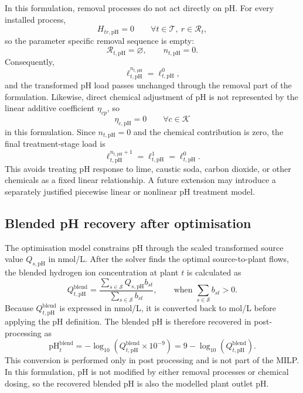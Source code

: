 \documentclass[10pt]{article}
\begin{document}
In this formulation, removal processes do not act directly on pH.
For every installed process,
\[
H_{tr,\mathrm{pH}}=0
\qquad
\forall t\in\mathcal{T},\ r\in\mathcal{R}_t,
\]
so the parameter specific removal sequence is empty:
\[
\mathcal{R}_{t,\mathrm{pH}}=\varnothing,
\qquad
n_{t,\mathrm{pH}}=0.
\]
Consequently,
\[
\ell^{n_{t,\mathrm{pH}}}_{t,\mathrm{pH}}
=
\ell^0_{t,\mathrm{pH}},
\]
and the transformed pH load passes unchanged through the removal part of the formulation.
Likewise, direct chemical adjustment of pH is not represented by the linear additive coefficient $\eta_{cp}$, so
\[
\eta_{c,\mathrm{pH}}=0
\qquad
\forall c\in\mathcal{K}
\]
in this formulation.
Since $n_{t,\mathrm{pH}}=0$ and the chemical contribution is zero, the final treatment-stage load is
\[
\ell^{n_{t,\mathrm{pH}}+1}_{t,\mathrm{pH}}
=
\ell^1_{t,\mathrm{pH}}
=
\ell^0_{t,\mathrm{pH}}.
\]
This avoids treating pH response to lime, caustic soda, carbon dioxide, or other chemicals as a fixed linear relationship.
A future extension may introduce a separately justified piecewise linear or nonlinear pH treatment model.

\subsection{Blended pH recovery after optimisation}

The optimisation model constrains pH through the scaled transformed source value $Q_{s,\mathrm{pH}}$ in nmol/L.
After the solver finds the optimal source-to-plant flows, the blended hydrogen ion concentration at plant $t$ is calculated as
\begin{equation}\label{eq:blended_ph_transformed}
    Q^{\mathrm{blend}}_{t,\mathrm{pH}}
    =
    \frac{
        \sum_{s \in \mathcal{S}} Q_{s,\mathrm{pH}}b_{st}
    }{
        \sum_{s \in \mathcal{S}} b_{st}
    },
    \qquad
    \text{when }
    \sum_{s \in \mathcal{S}} b_{st}>0.
\end{equation}
Because $Q^{\mathrm{blend}}_{t,\mathrm{pH}}$ is expressed in nmol/L, it is converted back to mol/L before applying the pH definition.
The blended pH is therefore recovered in post-processing as
\begin{equation}\label{eq:blended_ph_recovery}
    \mathrm{pH}^{\mathrm{blend}}_{t}
    =
    -\log_{10}
    \left(
        Q^{\mathrm{blend}}_{t,\mathrm{pH}}\times 10^{-9}
    \right)
    =
    9-\log_{10}
    \left(
        Q^{\mathrm{blend}}_{t,\mathrm{pH}}
    \right).
\end{equation}
This conversion is performed only in post processing and is not part of the MILP.
In this formulation, pH is not modified by either removal processes or chemical dosing, so the recovered blended pH is also the modelled plant outlet pH.
\end{document}
